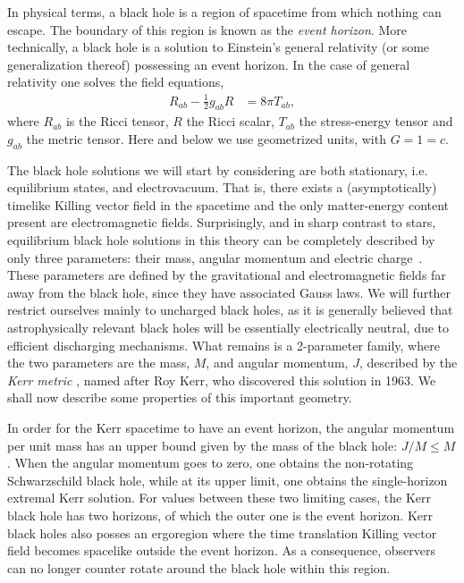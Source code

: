 In physical terms, a black hole is a region of spacetime from which nothing can escape.
The boundary of this region is known as the \textit{event horizon}.
More technically, a black hole is a solution to Einstein's general relativity (or some generalization thereof) possessing an event horizon.
In the case of general relativity one solves the field equations,
\begin{align}
  R_{ab} - \frac{1}{2}g_{ab}R  &= 8\pi T_{ab},
  \label{eqn:Einstein-eqns}
\end{align}
where $R_{ab}$ is the Ricci tensor, $R$ the Ricci scalar, $T_{ab}$ the stress-energy tensor and $g_{ab}$ the metric tensor.
Here and below we use geometrized units, with $G=1=c$.

The black hole solutions we will start by considering are both stationary, i.e. equilibrium states, and electrovacuum.
That is, there exists a (asymptotically) timelike Killing vector field in the spacetime and the only matter-energy content present are electromagnetic fields.
Surprisingly, and in sharp contrast to stars, equilibrium black hole solutions in this theory can be completely described by only three parameters: their mass, angular momentum and electric charge~\cite{Chrusciel:2012jk}.
These parameters are defined by the gravitational and electromagnetic fields far away from the black hole, since they have associated Gauss laws.
We will further restrict ourselves mainly to uncharged black holes, as it is generally believed that astrophysically relevant black holes will be essentially electrically neutral, due to efficient discharging mechanisms.
What remains is a 2-parameter family, where the two parameters are the mass, $M$, and angular momentum, $J$, described by the \textit{Kerr metric} \cite{Kerr:1963ud}, named after Roy Kerr, who discovered this solution in 1963.
We shall now describe some properties of this important geometry.

In order for the Kerr spacetime to have an event horizon, the angular momentum per unit mass has an upper bound given by the mass of the black hole: $J/M\le M$.
When the angular momentum goes to zero, one obtains the non-rotating Schwarzschild black hole, while at its upper limit, one obtains the single-horizon extremal Kerr solution.
For values between these two limiting cases, the Kerr black hole has two horizons, of which the outer one is the event horizon.
Kerr black holes also posses an ergoregion where the time translation Killing vector field becomes spacelike outside the event horizon.
As a consequence, observers can no longer counter rotate around the black hole within this region.

